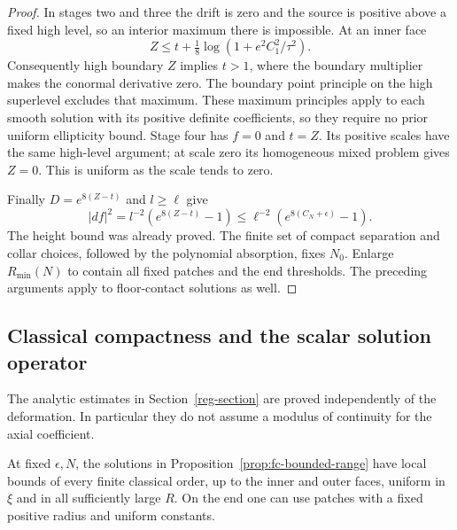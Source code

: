 \begin{proof}
In stages two and three the drift is zero and the source is
positive above a fixed high level, so an interior maximum there
is impossible.  At an inner face
\[
 Z\le t+\tfrac18\log(1+e^2C_1^2/\tau^2).
\]
Consequently high boundary $Z$ implies $t>1$, where the boundary
multiplier makes the conormal derivative zero.  The boundary
point principle on the high superlevel excludes that maximum.
These maximum principles apply to each smooth solution with its
positive definite coefficients, so they require no prior uniform
ellipticity bound.  Stage four has $f=0$ and $t=Z$.  Its positive
scales have the same high-level argument; at scale zero its
homogeneous mixed problem gives $Z=0$.  This is uniform as the
scale tends to zero.

Finally $D=e^{8(Z-t)}$ and $l\ge\ell$ give
\[
 |df|^2=l^{-2}(e^{8(Z-t)}-1)
                     \le\ell^{-2}(e^{8(C_N+\epsilon)}-1).
\]
The height bound was already proved.  The finite set of compact
separation and collar choices, followed by the polynomial
absorption, fixes $N_0$.  Enlarge $R_{\min}(N)$ to contain all
fixed patches and the end thresholds.  The preceding arguments
apply to floor-contact solutions as well.
\end{proof}

\subsection{Classical compactness and the scalar solution operator}

The analytic estimates in Section~\ref{reg-section} are proved
independently of the deformation.  In particular they do not
assume a modulus of continuity for the axial coefficient.

\begin{proposition}\label{prop:fc-classical-bounds}
At fixed $\epsilon,N$, the solutions in
Proposition~\ref{prop:fc-bounded-range} have local bounds of every
finite classical order, up to the inner and outer faces, uniform
in $\xi$ and in all sufficiently large $R$.  On the end one can
use patches with a fixed positive radius and uniform constants.
\end{proposition}

